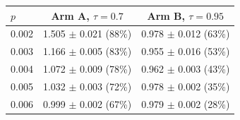 \begin{tabular}{lcc}
\toprule
$p$ & Arm A, $\tau=0.7$ & Arm B, $\tau=0.95$ \\
\midrule
0.002 & 1.505 $\pm$ 0.021 (88\%) & 0.978 $\pm$ 0.012 (63\%) \\
0.003 & 1.166 $\pm$ 0.005 (83\%) & 0.955 $\pm$ 0.016 (53\%) \\
0.004 & 1.072 $\pm$ 0.009 (78\%) & 0.962 $\pm$ 0.003 (43\%) \\
0.005 & 1.032 $\pm$ 0.003 (72\%) & 0.978 $\pm$ 0.002 (35\%) \\
0.006 & 0.999 $\pm$ 0.002 (67\%) & 0.979 $\pm$ 0.002 (28\%) \\
\bottomrule
\end{tabular}
